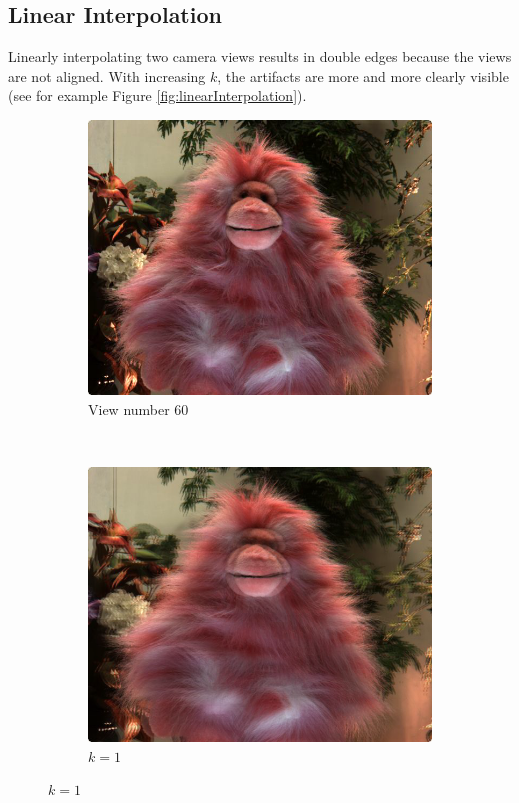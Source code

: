 \documentclass[a4paper]{article}
\begin{document}
\subsection*{Linear Interpolation}
Linearly interpolating two camera views results in double edges because the views are not aligned. With increasing $k$, the artifacts are more and more clearly visible (see for example Figure \ref{fig:linearInterpolation}). 
\begin{figure}[ht]
	\begin{subfigure}[h]{0.48\textwidth}
	  \includegraphics[width=\textwidth]{view60}
	  \caption*{View number 60}
	\end{subfigure}
    	~
	\begin{subfigure}[h]{0.48\textwidth}
	  \centering
	  \includegraphics[width=\textwidth]{LinearInterpolation60_61}
	  \caption*{$k=1$}
	\end{subfigure}
	

\end{figure}
\end{document}
